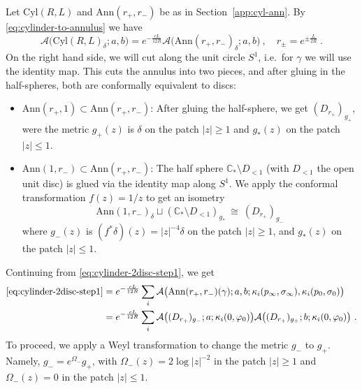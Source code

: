 \documentclass[11pt,a4paper]{article}
\numberwithin{equation}{section}
\begin{document}
Let $\mathrm{Cyl}(R,L)$ and $\mathrm{Ann}(r_+,r_-)$ be as in Section~\ref{app:cyl-ann}. By \eqref{eq:cylinder-to-annulus} we  have
\begin{equation}\label{eq:cylinder-2disc-step1}
    \mathcal{A}\big(\mathrm{Cyl}(R,L)_\delta;a,b\big) 
= e^{-\frac{c L}{12 R}} \mathcal{A}\big(\mathrm{Ann}(r_+,r_-)_\delta;a,b\big) \ ,
\quad r_\pm= e^{\pm \frac{ L}{2R}}\ .
\end{equation}
On the right hand side, we will cut along the unit circle $S^1$, i.e.\ for $\gamma$ we will use the identity map. This cuts the annulus into two pieces, and after gluing in the half-spheres, both are conformally equivalent to discs:
\begin{itemize}
    \item 
$\mathrm{Ann}(r_+,1) \subset \mathrm{Ann}(r_+,r_-)$: After gluing the half-sphere, we get $(D_{r_+})_{g_+}$, were the metric $g_+(z)$ is $\delta$ on the patch $|z|\ge 1$ and $g_*(z)$ on the patch $|z| \le 1$.

\item $\mathrm{Ann}(1,r_-) \subset \mathrm{Ann}(r_+,r_-)$: The half sphere $\mathbb{C}_* \setminus D_{<1}$ (with $D_{<1}$ the open unit disc) is glued via the identity map along $S^1$. We apply the conformal transformation $f(z) = 1/z$ to get an isometry
\begin{equation}\label{eq:ann-closed-fact-aux1}
    \mathrm{Ann}(1,r_-)_\delta
    \sqcup (\mathbb{C}_* \setminus D_{<1})_{g_*}
    ~\cong~ (D_{r_+})_{g_-}
\end{equation}
where $g_-(z)$ is $(f^* \delta)(z) = |z|^{-4} \delta$ on the patch $|z| \ge 1$, and $g_*(z)$ on the patch $|z| \le 1$.
\end{itemize}
Continuing from \eqref{eq:cylinder-2disc-step1}, we get
\begin{align}
    \eqref{eq:cylinder-2disc-step1}
    &=
 e^{-\frac{c L}{12 R}} \sum_i 
 \mathcal{A}\big(\mathrm{Ann}(r_+,r_-)(\gamma);a,b;\kappa_i(p_\infty,\sigma_\infty), \kappa_i(p_0,\sigma_0) \big)
\nonumber\\
&=
 e^{-\frac{c L}{12 R}} \sum_i 
 \mathcal{A}\big((D_{r_+})_{g_-};a;\kappa_i(0,\varphi_0) \big)
 \mathcal{A}\big((D_{r_+})_{g_+};b;\kappa_i(0,\varphi_0) \big) \ .
\end{align}
To proceed, we apply a Weyl transformation to change the metric $g_-$ to $g_+$. Namely, $g_- = e^{\Omega_-} g_+$, with $\Omega_-(z) = 2 \log|z|^{-2}$ in the patch $|z|\ge 1$ and $\Omega_-(z)=0$ in the patch $|z| \le 1$.
\end{document}
